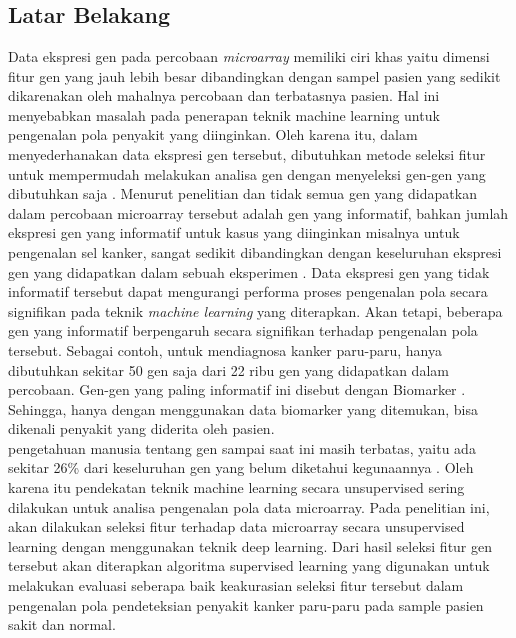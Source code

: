 \chapter{\babSatu}

\section{Latar Belakang}
Data ekspresi gen pada percobaan \textit{microarray} memiliki ciri khas yaitu dimensi fitur gen yang jauh lebih besar dibandingkan dengan sampel pasien yang sedikit dikarenakan oleh mahalnya percobaan dan terbatasnya pasien. Hal ini menyebabkan masalah pada penerapan teknik machine learning untuk pengenalan pola penyakit yang diinginkan. Oleh karena itu, dalam menyederhanakan data ekspresi gen tersebut, dibutuhkan metode seleksi fitur untuk mempermudah melakukan analisa gen dengan menyeleksi gen-gen yang dibutuhkan saja \citep{yoon2006building}. Menurut penelitian \cite{yoon2006building} dan \cite{bandyopadhyay2014survey} tidak semua gen yang didapatkan dalam percobaan microarray tersebut adalah gen yang informatif, bahkan jumlah ekspresi gen yang informatif untuk kasus yang diinginkan misalnya untuk pengenalan sel kanker, sangat sedikit dibandingkan dengan keseluruhan ekspresi gen yang didapatkan dalam sebuah eksperimen \citep{bandyopadhyay2014survey}. Data ekspresi gen yang tidak informatif tersebut dapat mengurangi performa  proses pengenalan pola secara signifikan pada teknik \textit{machine learning} yang diterapkan. Akan tetapi, beberapa gen yang informatif berpengaruh secara signifikan terhadap pengenalan pola tersebut. Sebagai contoh, untuk mendiagnosa kanker paru-paru, hanya dibutuhkan sekitar 50 gen saja dari 22 ribu gen yang didapatkan dalam percobaan. Gen-gen yang paling informatif ini disebut dengan Biomarker \citep{belinsky2004gene}. Sehingga, hanya dengan menggunakan data biomarker yang ditemukan, bisa dikenali penyakit yang diderita oleh pasien.\\
pengetahuan manusia tentang gen sampai saat ini masih terbatas, yaitu ada sekitar 26\% dari keseluruhan gen yang belum diketahui kegunaannya \citep{haggstrom2014diagram}. Oleh karena itu pendekatan teknik machine learning secara unsupervised sering dilakukan untuk analisa pengenalan pola data microarray. Pada penelitian ini, akan dilakukan seleksi fitur terhadap data microarray secara unsupervised learning dengan menggunakan teknik deep learning. Dari hasil seleksi fitur gen tersebut akan diterapkan algoritma supervised learning yang digunakan untuk melakukan evaluasi seberapa baik keakurasian seleksi fitur tersebut dalam pengenalan pola pendeteksian penyakit kanker paru-paru pada sample pasien sakit dan normal. \\
